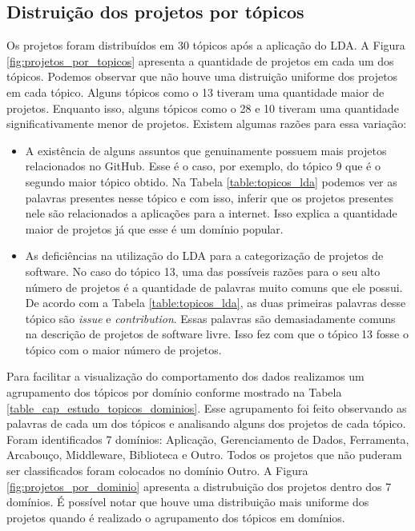 \subsection{Distruição dos projetos por tópicos}


Os projetos foram distribuídos em 30 tópicos após a aplicação do LDA. A Figura \ref{fig:projetos_por_topicos} apresenta a quantidade de projetos em cada um dos tópicos. Podemos observar que não houve uma distruição uniforme dos projetos em cada tópico. Alguns tópicos como o 13 tiveram uma quantidade maior de projetos. Enquanto isso, alguns tópicos como o 28 e 10 tiveram uma quantidade significativamente menor de projetos. Existem algumas razões para essa variação:

\begin{itemize}
\item A existência de alguns assuntos que genuinamente possuem mais projetos relacionados no GitHub. Esse é o caso, por exemplo, do tópico 9 que é o segundo maior tópico obtido. Na Tabela \ref{table:topicos_lda} podemos ver as palavras presentes nesse tópico e com isso, inferir que os projetos presentes nele são relacionados a aplicações para a internet. Isso explica a quantidade maior de projetos já que esse é um domínio popular. 
\item As deficiências na utilização do LDA para a categorização de projetos de software. No caso do tópico 13, uma das possíveis razões para o seu alto número de projetos é a quantidade de palavras muito comuns que ele possui. De acordo com a Tabela \ref{table:topicos_lda}, as duas primeiras palavras desse tópico são \textit{issue} e \textit{contribution}. Essas palavras são demasiadamente comuns na descrição de projetos de software livre. Isso fez com que o tópico 13 fosse o tópico com o maior número de projetos.
\end{itemize} 


Para facilitar a visualização do comportamento dos dados  realizamos um agrupamento dos tópicos por domínio conforme mostrado na Tabela \ref{table_cap_estudo_topicos_dominios}. Esse agrupamento foi feito observando as palavras de cada um dos tópicos e analisando alguns dos projetos de cada tópico. Foram identificados 7 domínios: Aplicação, Gerenciamento de Dados, Ferramenta, Arcabouço, Middleware, Biblioteca e Outro. Todos os projetos que não puderam ser classificados foram colocados no domínio Outro. A Figura \ref{fig:projetos_por_dominio} apresenta a distrubuição dos projetos dentro dos 7 domínios. É possível notar que houve uma distribuição mais uniforme dos projetos quando é realizado o agrupamento dos tópicos em domínios. 



